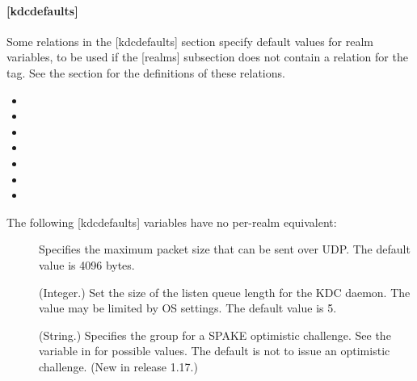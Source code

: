 \documentclass[letterpaper,10pt,english]{sphinxmanual}
\begin{document}
\paragraph{{[}kdcdefaults{]}}
\label{\detokenize{admin/conf_files/kdc_conf:kdcdefaults}}\label{\detokenize{admin/conf_files/kdc_conf:id1}}
Some relations in the {[}kdcdefaults{]} section specify default values for
realm variables, to be used if the {[}realms{]} subsection does not
contain a relation for the tag.  See the {\hyperref[\detokenize{admin/conf_files/kdc_conf:kdc-realms}]{}} section for
the definitions of these relations.
\begin{itemize}
\item {} 

\item {} 

\item {} 

\item {} 

\item {} 

\item {} 

\item {} 

\end{itemize}

The following {[}kdcdefaults{]} variables have no per-realm equivalent:
\begin{description}
\item[{}] \leavevmode
Specifies the maximum packet size that can be sent over UDP.  The
default value is 4096 bytes.

\item[{}] \leavevmode
(Integer.)  Set the size of the listen queue length for the KDC
daemon.  The value may be limited by OS settings.  The default
value is 5.

\item[{}] \leavevmode
(String.)  Specifies the group for a SPAKE optimistic challenge.
See the  variable in {\hyperref[\detokenize{admin/conf_files/krb5_conf:libdefaults}]{}}
for possible values.  The default is not to issue an optimistic
challenge.  (New in release 1.17.)

\end{description}
\end{document}
